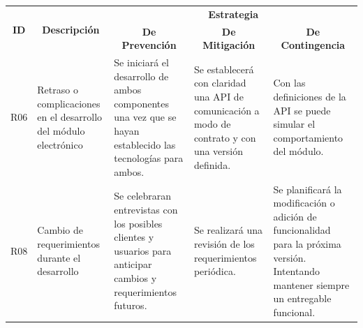 \begin{table}[ht]
	\begin{tabular}{|c|m{3cm}|m{3cm}|m{3cm}|m{3.5cm}|}
		\hline
		\multirow{2}{*}{\textbf{ID}} & \multicolumn{1}{c|}{\multirow{2}{*}{\textbf{Descripción}}}                       & \multicolumn{3}{c|}{\textbf{Estrategia}}                                                                                                                                                                                                                                                                                                                                                                                                                                                                                           \\ \cline{3-5} 
		& \multicolumn{1}{c|}{}                                                            & \multicolumn{1}{c|}{\textbf{De Prevención}}                                                                                                                           & \multicolumn{1}{c|}{\textbf{De Mitigación}}                                                                                                                                  & \multicolumn{1}{c|}{\textbf{De Contingencia}}                                                                                                                               \\ \hline
		R06                          & Retraso o complicaciones en el desarrollo del módulo electrónico                 & Se iniciará el desarrollo de ambos componentes una vez que se hayan establecido las tecnologías para ambos.                                                           & Se establecerá con claridad una API de comunicación a modo de contrato y con una versión definida.                                                                           & Con las definiciones de la API se puede simular el comportamiento del módulo.                                                                                               \\ \hline
		R08                          & Cambio de requerimientos durante el desarrollo                                  & Se celebraran entrevistas con los posibles clientes y usuarios para anticipar cambios y requerimientos futuros.                                                       & Se realizará una revisión de los requerimientos periódica.                                                                                                                   & Se planificará la modificación o adición de funcionalidad para la próxima versión. Intentando mantener siempre un entregable funcional.                                       \\ \hline

\end{tabular}
\end{table}
